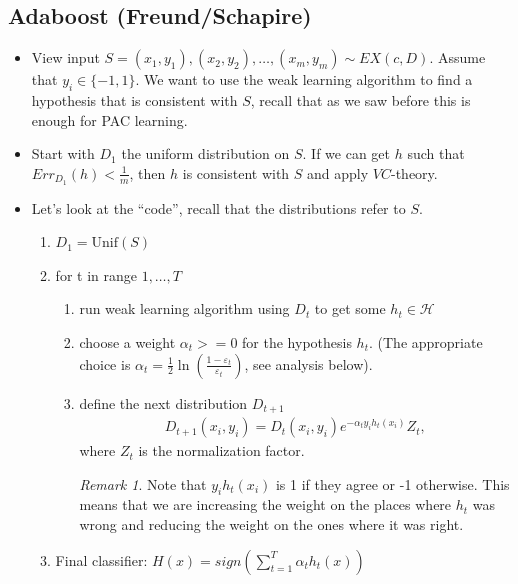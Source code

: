 \documentclass[12pt, letterpaper]{article}
\numberwithin{equation}{section} %
\newcommand{\mc}{\mathcal}
\newcommand{\ve}{\varepsilon}
\theoremstyle{definition}
\theoremstyle{remark}
\newtheorem{remark}[theorem]{Remark}
\begin{document}
\subsection{Adaboost (Freund/Schapire)}
\begin{itemize}
\item View input $S = (x_1, y_1), (x_2, y_2), \ldots, (x_m, y_m) \sim EX(c,D)$. Assume that $y_i\in\lbrace-1,1\rbrace$. We want to use the weak learning algorithm to find a hypothesis that is consistent with $S$, recall that as we saw before this is enough for PAC learning.
\item Start with $D_1$ the uniform distribution on $S$. If we can get $h$ such that $Err_{D_1}(h)<\frac1m$, then $h$ is consistent with $S$ and apply $VC$-theory.
\item Let's look at the ``code'', recall that the distributions refer to $S$.
\begin{enumerate}[]
\item $D_1 = \textrm{Unif}(S)$
\item for t in range $1,\ldots, T$
    \begin{enumerate}[-]
    \item run weak learning algorithm using $D_t$ to get some $h_t \in \mc H$
    \item choose a weight $\alpha_t >= 0$ for the hypothesis $h_t$. (The appropriate choice is  $\alpha_t=\frac12 \ln\left(\frac{1-\ve_t}{\ve_t}\right)$, see analysis below).
    \item define the next distribution $D_{t+1}$
        \begin{align}D_{t+1}(x_i, y_i) = D_t(x_i, y_i)e^{-\alpha_ty_ih_t(x_i)}{Z_t},\end{align}
        where $Z_t$ is the normalization factor.
        \begin{remark}
        Note that $y_ih_t(x_i)$ is 1 if they agree or -1 otherwise. This means that we are increasing the weight on the places where $h_t$ was  wrong and reducing the weight on the ones where it was right.
        \end{remark}
    \end{enumerate}
\item Final classifier: $H(x) = sign\left(\sum_{t=1}^T\alpha_th_t(x)\right)$
\end{enumerate}
\end{itemize}
\end{document}
